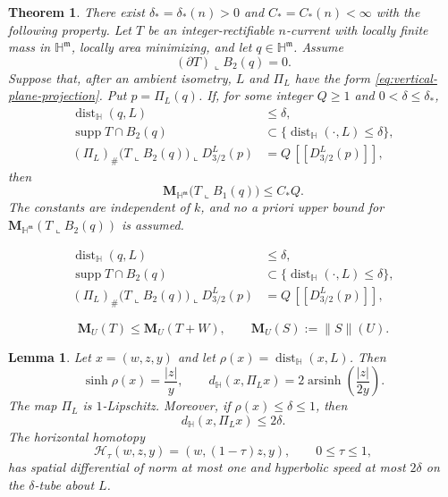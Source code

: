 \documentclass[10pt,a4paper]{amsart}
\newtheorem{theorem}{Theorem}
\newtheorem{lemma}{Lemma}
\newcommand{\Hyp}{\mathbb H}
\newcommand{\Mass}{\mathbf M}
\newcommand{\cur}[1]{\left[\!\left[#1\right]\!\right]}
\newcommand{\dist}{\operatorname{dist}}
\newcommand{\restr}{\mathbin{\llcorner}}
\newcommand{\supp}{\operatorname{supp}}
\begin{document}
\begin{theorem}
\label{thm:local-mass}
There exist $\delta_*=\delta_*(n)>0$ and $C_*=C_*(n)<\infty$ with the
following property.  Let $T$ be an integer-rectifiable $n$-current with
locally finite mass in $\Hyp^{\mathfrak m}$, locally area minimizing, and let
$q\in\Hyp^{\mathfrak m}$.  Assume
\begin{equation}\label{eq:no-boundary-local}
 (\partial T)\restr B_2(q)=0.
\end{equation}
Suppose that, after an ambient isometry, $L$ and $\Pi_L$ have the form
\eqref{eq:vertical-plane-projection}.  Put $p=\Pi_L(q)$.  If, for some
integer $Q\ge1$ and $0<\delta\le\delta_*$,
\begin{align}
 \dist_{\Hyp}(q,L)&\le\delta,\label{eq:center-local}\\
 \supp T\cap B_2(q)&\subset
 \{\dist_{\Hyp}(\cdot,L)\le\delta\},\label{eq:tube-local}\\
 (\Pi_L)_\#\bigl(T\restr B_2(q)\bigr)\restr D_{3/2}^L(p)
 &=Q\,\cur{D_{3/2}^L(p)},\label{eq:projection-local}
\end{align}
then
\begin{equation}\label{eq:mass-local}
 \Mass_{\Hyp^{\mathfrak m}}\bigl(T\restr B_1(q)\bigr)\le C_*Q.
\end{equation}
The constants are independent of $k$, and no a priori upper bound for
$\Mass_{\Hyp^{\mathfrak m}}(T\restr B_2(q))$ is assumed.
\end{theorem}

\begin{align}
 \dist_{\Hyp}(q,L)&\le\delta,\\
 \supp T\cap B_2(q)&\subset
 \{\dist_{\Hyp}(\cdot,L)\le\delta\},\\
 (\Pi_L)_\#\bigl(T\restr B_2(q)\bigr)\restr D_{3/2}^L(p)
 &=Q\,\cur{D_{3/2}^L(p)},
\end{align}

\begin{equation}\label{eq:local-minimizer-definition}
 \Mass_U(T)\le \Mass_U(T+W),
 \qquad \Mass_U(S):=\|S\|(U).
\end{equation}

\begin{lemma}\label{lem:vertical-projection}
Let $x=(w,z,y)$ and let
$\rho(x)=\dist_{\Hyp}(x,L)$.  Then
\begin{equation}\label{eq:vertical-distance-formulas}
 \sinh\rho(x)=\frac{|z|}{y},
 \qquad
 d_{\Hyp}(x,\Pi_Lx)
 =2\operatorname{arsinh}\!\left(\frac{|z|}{2y}\right).
\end{equation}
The map $\Pi_L$ is $1$-Lipschitz.  Moreover, if $\rho(x)\le\delta\le1$,
then
\begin{equation}\label{eq:projection-displacement}
 d_{\Hyp}(x,\Pi_Lx)\le2\delta.
\end{equation}
The horizontal homotopy
\begin{equation}\label{eq:horizontal-homotopy}
 \mathcal H_\tau(w,z,y)=(w,(1-\tau)z,y),
 \qquad 0\le\tau\le1,
\end{equation}
has spatial differential of norm at most one and hyperbolic speed at most
$2\delta$ on the $\delta$-tube about $L$.
\end{lemma}
\end{document}
